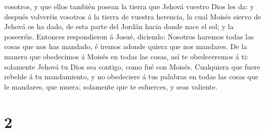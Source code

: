 vosotros, y que ellos también posean la tierra que Jehová vuestro Dios
les da: y después volveréis vosotros á la tierra de vuestra herencia, la
cual Moisés siervo de Jehová os ha dado, de esta parte del Jordán hacia
donde nace el sol; y la poseeréis.  Entonces respondieron á
Josué, diciendo: Nosotros haremos todas las cosas que nos has mandado, é
iremos adonde quiera que nos mandares.  De la manera que
obedecimos á Moisés en todas las cosas, así te obedeceremos á ti:
solamente Jehová tu Dios sea contigo, como fué con Moisés. 
Cualquiera que fuere rebelde á tu mandamiento, y no obedeciere á tus
palabras en todas las cosas que le mandares, que muera; solamente que te
esfuerces, y seas valiente.

\hypertarget{section-1}{%
\section{2}\label{section-1}}

